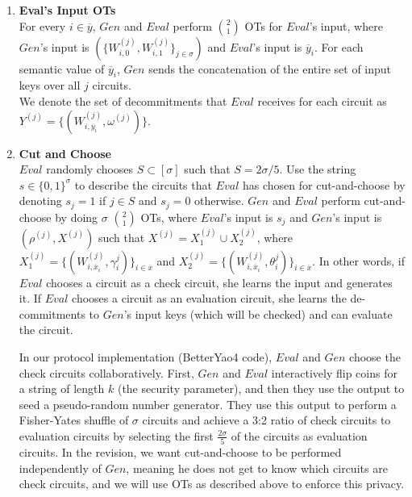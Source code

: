 \documentclass{article}
\begin{document}
\begin{enumerate}
	\item \label{step:eval-inp-ot} \textbf{Eval's Input OTs}\\
	For every $i \in \overline{y}$, $Gen$ and $Eval$ perform ${2 \choose 1}$ OTs for $Eval$'s input, where $Gen$'s input is $(\{W_{i,0}^{(j)},W_{i,1}^{(j)}\}_{j \in \sigma})$ and $Eval$'s input is $\overline{y}_{i}$. For each semantic value of $\overline{y}_{i}$, $Gen$ sends the concatenation of the entire set of input keys over all $j$ circuits.\\
	We denote the set of decommitments that $Eval$ receives for each circuit as $Y^{(j)} = \{ (W_{i,\overline{y}_{i}}^{(j)},\omega^{(j)}) \}$. 
	
	\item \label{step:cut-and-choose} \textbf{Cut and Choose}\\
	$Eval$ randomly chooses $S \subset [\sigma]$ such that $S = 2\sigma / 5$. Use the string $s \in \{0,1\}^{\sigma}$ to describe the circuits that $Eval$ has chosen for cut-and-choose by denoting $s_{j} = 1$ if $j \in S$ and $s_{j} = 0$ otherwise.  $Gen$ and $Eval$ perform cut-and-choose by doing $\sigma$ ${2 \choose 1}$ OTs, where $Eval$'s input is $s_{j}$ and $Gen$'s input is $(\rho^{(j)}, X^{(j)})$ such that $X^{(j)} = X_{1}^{(j)} \cup X_{2}^{(j)}$, where $X_{1}^{(j)} = \{(W_{i,\overline{x}_{i}}^{(j)},\gamma_{i}^{j})\}_{i \in \overline{x}}$ and $X_{2}^{(j)} = \{(W_{i,\overline{x}_{i}}^{(j)},\theta_{i}^{j})\}_{i \in \overline{x}}$. In other words, if $Eval$ chooses a circuit as a check circuit, she learns the input and generates it. If $Eval$ chooses a circuit as an evaluation circuit, she learns the de-commitments to $Gen$'s input keys (which will be checked) and can evaluate the circuit. \\
	
	In our protocol implementation (BetterYao4 code), $Eval$ and $Gen$ choose the check circuits collaboratively. First, $Gen$ and $Eval$ interactively flip coins for a string of length $k$ (the security parameter), and then they use the output to seed a pseudo-random number generator. They use this output to perform a Fisher-Yates shuffle of $\sigma$ circuits and achieve a 3:2 ratio of check circuits to evaluation circuits by selecting the first $\frac{2\sigma}{5}$ of the circuits as evaluation circuits.  In the revision, we want cut-and-choose to be performed independently of $Gen$, meaning he does not get to know which circuits are check circuits, and we will use OTs as described above to enforce this privacy.\\


\end{enumerate}
\end{document}
